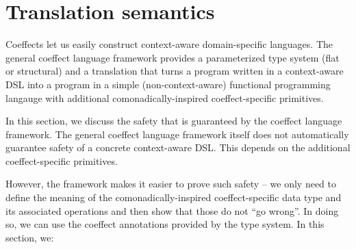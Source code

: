 \documentclass[
		twoside,openright,titlepage,numbers=noenddot,headinclude,%
                footinclude=true,cleardoublepage=empty,
                BCOR=10mm,paper=a4,fontsize=10pt, %
                ngerman,american, %
                ]{scrreprt}
\begin{document}
\frenchspacing %
\raggedbottom %
\pagestyle{plain} %



\chapter*{Translation semantics}
\renewcommand*\thesection{\arabic{section}}

Coeffects let us easily construct context-aware domain-specific languages. The general coeffect
language framework provides a parameterized type system (flat or structural) and a translation
that turns a program written in a context-aware DSL into a program in a simple (non-context-aware)
functional programming langauge with additional comonadically-inspired coeffect-specific primitives.

In this section, we discuss the safety that is guaranteed by the coeffect language framework.
The general coeffect language framework itself does not automatically guarantee safety of a 
concrete context-aware DSL. This depends on the additional coeffect-specific primitives.

However, the framework makes it easier to prove such safety -- we only need to define the
meaning of the comonadically-inspired coeffect-specific data type and its associated operations and 
then show that those do not ``go wrong''. In doing so, we can use the coeffect annotations
provided by the type system. In this section, we:
\end{document}
